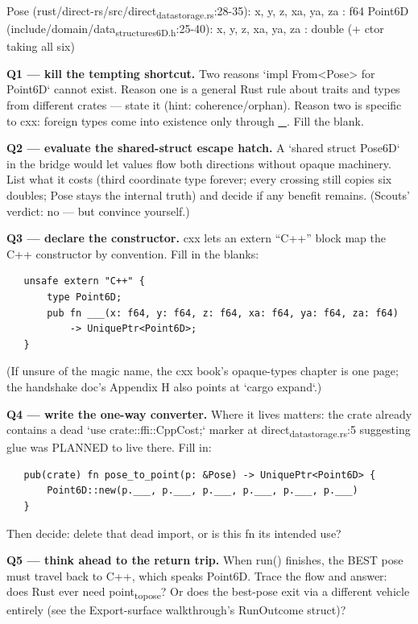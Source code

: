 \documentclass[11pt]{article}
\begin{document}
Pose (rust/direct-rs/src/direct\textsubscript{data}\textsubscript{storage.rs}:28-35):
  x, y, z, xa, ya, za : f64
Point6D (include/domain/data\textsubscript{structures}\textsubscript{6D.h}:25-40):
  x, y, z, xa, ya, za : double   (+ ctor taking all six)

\textbf{Q1 — kill the tempting shortcut.} Two reasons `impl From<Pose> for
Point6D` cannot exist. Reason one is a general Rust rule about traits
and types from different crates — state it (hint: coherence/orphan).
Reason two is specific to cxx: foreign types come into existence only
through \uline{\_}. Fill the blank.

\textbf{Q2 — evaluate the shared-struct escape hatch.} A `shared struct
Pose6D` in the bridge would let values flow both directions without
opaque machinery. List what it costs (third coordinate type forever;
every crossing still copies six doubles; Pose stays the internal truth)
and decide if any benefit remains. (Scouts' verdict: no — but convince
yourself.)

\textbf{Q3 — declare the constructor.} cxx lets an extern ``C++'' block map the
C++ constructor by convention. Fill in the blanks:

\begin{verbatim}
   unsafe extern "C++" {
       type Point6D;
       pub fn ___(x: f64, y: f64, z: f64, xa: f64, ya: f64, za: f64)
           -> UniquePtr<Point6D>;
   }
\end{verbatim}

(If unsure of the magic name, the cxx book's opaque-types chapter is
one page; the handshake doc's Appendix H also points at `cargo expand`.)

\textbf{Q4 — write the one-way converter.} Where it lives matters: the crate
already contains a dead `use crate::ffi::CppCost;` marker at
direct\textsubscript{data}\textsubscript{storage.rs}:5 suggesting glue was PLANNED to live there. Fill
in:

\begin{verbatim}
   pub(crate) fn pose_to_point(p: &Pose) -> UniquePtr<Point6D> {
       Point6D::new(p.___, p.___, p.___, p.___, p.___, p.___)
   }
\end{verbatim}

Then decide: delete that dead import, or is this fn its intended use?

\textbf{Q5 — think ahead to the return trip.} When run() finishes, the BEST
pose must travel back to C++, which speaks Point6D. Trace the flow and
answer: does Rust ever need point\textsubscript{to}\textsubscript{pose}? Or does the best-pose exit
via a different vehicle entirely (see the Export-surface walkthrough's
RunOutcome struct)?
\end{document}
